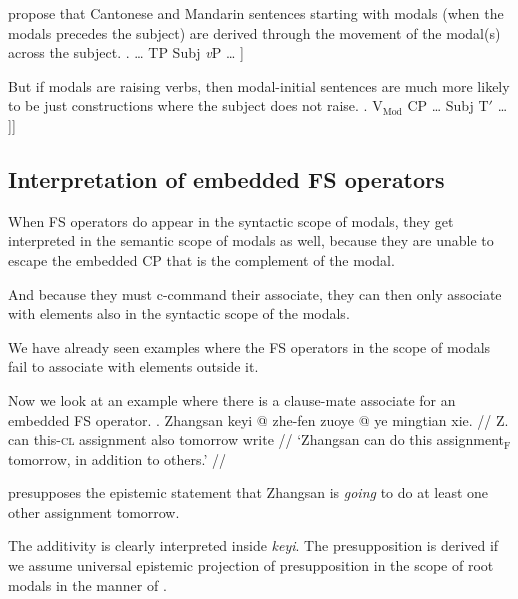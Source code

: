 \documentclass[11pt]{article}
\newcommand{\F}{\ensuremath{_{\mathrm{F}}}}
\begin{document}
\citet{yipGeneralizedScopeEconomy2020,leeMovementQuantificationalHeads2021,laiMovingHeadsSpecifiers2024} propose that Cantonese and Mandarin sentences starting with modals (when the modals precedes the subject) are derived through the movement of the modal(s) across the subject.
\ex.  \ldots{} \I{[}TP Subj  \I{[}\emph{v}P \ldots{} ]

But if modals are raising verbs, then modal-initial sentences are much more likely to be just constructions where the subject does not raise.
\ex. V\(_{\mathrm{Mod}}\) \I{[}CP \ldots{} Subj \I{[}T\('\) \ldots{} ]]


\subsection{Interpretation of embedded FS operators}
\label{sub:interpretation_of_embedded_fs_operators}

When FS operators do appear in the syntactic scope of modals, they get interpreted in the semantic scope of modals as well, because they are unable to escape the embedded CP that is the complement of the modal.

And because they must c-command their associate, they can then only associate with elements also in the syntactic scope of the modals.

We have already seen examples where the FS operators in the scope of modals fail to associate with elements outside it.

Now we look at an example where there is a clause-mate associate for an embedded FS operator.
\ex. \begingl
\gla Zhangsan keyi \nogloss{[} @ zhe-fen zuoye @ \nogloss{]\F{}} ye mingtian xie. //
  \glb Z. can this-\textsc{cl} assignment also tomorrow write //
  \glft `Zhangsan can do this assignment\F{} tomorrow, in addition to others.' //
\endgl

\Last presupposes the epistemic statement that Zhangsan is \emph{going} to do at least one other assignment tomorrow.

The additivity is clearly interpreted inside \emph{keyi}.
The presupposition is derived if we assume universal epistemic projection of presupposition in the scope of root modals in the manner of \citet{heimPresuppositionProjectionSemantics1992}.
\end{document}
